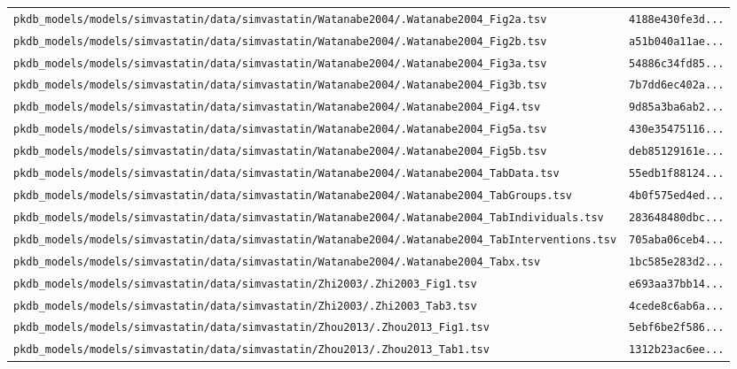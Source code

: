 \begin{longtable}{ll}
\texttt{pkdb\_models/models/simvastatin/data/simvastatin/Watanabe2004/.Watanabe2004\_Fig2a.tsv} & \texttt{4188e430fe3d...} \\
\texttt{pkdb\_models/models/simvastatin/data/simvastatin/Watanabe2004/.Watanabe2004\_Fig2b.tsv} & \texttt{a51b040a11ae...} \\
\texttt{pkdb\_models/models/simvastatin/data/simvastatin/Watanabe2004/.Watanabe2004\_Fig3a.tsv} & \texttt{54886c34fd85...} \\
\texttt{pkdb\_models/models/simvastatin/data/simvastatin/Watanabe2004/.Watanabe2004\_Fig3b.tsv} & \texttt{7b7dd6ec402a...} \\
\texttt{pkdb\_models/models/simvastatin/data/simvastatin/Watanabe2004/.Watanabe2004\_Fig4.tsv} & \texttt{9d85a3ba6ab2...} \\
\texttt{pkdb\_models/models/simvastatin/data/simvastatin/Watanabe2004/.Watanabe2004\_Fig5a.tsv} & \texttt{430e35475116...} \\
\texttt{pkdb\_models/models/simvastatin/data/simvastatin/Watanabe2004/.Watanabe2004\_Fig5b.tsv} & \texttt{deb85129161e...} \\
\texttt{pkdb\_models/models/simvastatin/data/simvastatin/Watanabe2004/.Watanabe2004\_TabData.tsv} & \texttt{55edb1f88124...} \\
\texttt{pkdb\_models/models/simvastatin/data/simvastatin/Watanabe2004/.Watanabe2004\_TabGroups.tsv} & \texttt{4b0f575ed4ed...} \\
\texttt{pkdb\_models/models/simvastatin/data/simvastatin/Watanabe2004/.Watanabe2004\_TabIndividuals.tsv} & \texttt{283648480dbc...} \\
\texttt{pkdb\_models/models/simvastatin/data/simvastatin/Watanabe2004/.Watanabe2004\_TabInterventions.tsv} & \texttt{705aba06ceb4...} \\
\texttt{pkdb\_models/models/simvastatin/data/simvastatin/Watanabe2004/.Watanabe2004\_Tabx.tsv} & \texttt{1bc585e283d2...} \\
\texttt{pkdb\_models/models/simvastatin/data/simvastatin/Zhi2003/.Zhi2003\_Fig1.tsv} & \texttt{e693aa37bb14...} \\
\texttt{pkdb\_models/models/simvastatin/data/simvastatin/Zhi2003/.Zhi2003\_Tab3.tsv} & \texttt{4cede8c6ab6a...} \\
\texttt{pkdb\_models/models/simvastatin/data/simvastatin/Zhou2013/.Zhou2013\_Fig1.tsv} & \texttt{5ebf6be2f586...} \\
\texttt{pkdb\_models/models/simvastatin/data/simvastatin/Zhou2013/.Zhou2013\_Tab1.tsv} & \texttt{1312b23ac6ee...} \\

\end{longtable}
